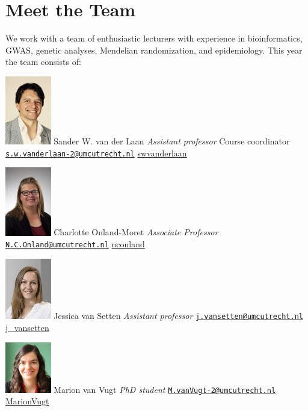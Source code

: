 \documentclass[
]{book}
\begin{document}
\hypertarget{meet-the-team}{%
\section{Meet the Team}\label{meet-the-team}}

We work with a team of enthusiastic lecturers with experience in bioinformatics, GWAS, genetic analyses, Mendelian randomization, and epidemiology. This year the team consists of:

\includegraphics[width=0.15\textwidth,height=\textheight]{img/sander_vander_laan.jpg}
Sander W. van der Laan
\emph{Assistant professor}
Course coordinator
\href{mailto:s.w.vanderlaan-2@umcutrecht.nl}{\nolinkurl{s.w.vanderlaan-2@umcutrecht.nl}} \textbar{} \href{http://www.twitter.com/swvanderlaan}{swvanderlaan}

\includegraphics[width=0.15\textwidth,height=\textheight]{img/charlotte_onland.jpg}
Charlotte Onland-Moret
\emph{Associate Professor}
\href{mailto:N.C.Onland@umcutrecht.nl}{\nolinkurl{N.C.Onland@umcutrecht.nl}} \textbar{} \href{http://www.twitter.com/nconland}{nconland}

\includegraphics[width=0.15\textwidth,height=\textheight]{img/jessica_van_setten.jpg}
Jessica van Setten
\emph{Assistant professor}
\href{mailto:j.vansetten@umcutrecht.nl}{\nolinkurl{j.vansetten@umcutrecht.nl}} \textbar{} \href{http://www.twitter.com/j_vansetten}{j\_vansetten}

\includegraphics[width=0.15\textwidth,height=\textheight]{img/marion_van_vugt.jpg}
Marion van Vugt
\emph{PhD student}
\href{mailto:M.vanVugt-2@umcutrecht.nl}{\nolinkurl{M.vanVugt-2@umcutrecht.nl}} \textbar{} \href{http://www.twitter.com/MarionVugt}{MarionVugt}
\end{document}
